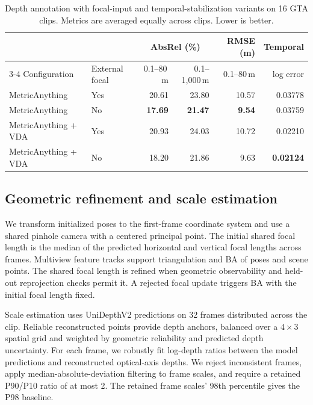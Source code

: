 \begin{table}[t]
    \centering
    \caption{Depth annotation with focal-input and temporal-stabilization variants on 16 GTA clips. Metrics are averaged equally across clips. Lower is better.}
    \label{tab:supp_depth}
    \small
    \setlength{\tabcolsep}{8pt}
    \begin{tabular}{@{}llrrrr@{}}
        \toprule
        & & \multicolumn{2}{c}{AbsRel (\%)} & RMSE (m) & Temporal \\
        \cmidrule(lr){3-4}
        Configuration & External focal & 0.1--80\,m & 0.1--1,000\,m & 0.1--80\,m & log error \\
        \midrule
        MetricAnything & Yes & 20.61 & 23.80 & 10.57 & 0.03778 \\
        MetricAnything & No & \textbf{17.69} & \textbf{21.47} & \textbf{9.54} & 0.03759 \\
        MetricAnything + VDA & Yes & 20.93 & 24.03 & 10.72 & 0.02210 \\
        MetricAnything + VDA & No & 18.20 & 21.86 & 9.63 & \textbf{0.02124} \\
        \bottomrule
    \end{tabular}
\end{table}

\subsection{Geometric refinement and scale estimation}

We transform initialized poses to the first-frame coordinate system and use a shared pinhole camera with a centered principal point.
The initial shared focal length is the median of the predicted horizontal and vertical focal lengths across frames.
Multiview feature tracks support triangulation and BA of poses and scene points.
The shared focal length is refined when geometric observability and held-out reprojection checks permit it.
A rejected focal update triggers BA with the initial focal length fixed.

Scale estimation uses UniDepthV2 predictions on 32 frames distributed across the clip.
Reliable reconstructed points provide depth anchors, balanced over a $4\!\times\!3$ spatial grid and weighted by geometric reliability and predicted depth uncertainty.
For each frame, we robustly fit log-depth ratios between the model predictions and reconstructed optical-axis depths.
We reject inconsistent frames, apply median-absolute-deviation filtering to frame scales, and require a retained P90/P10 ratio of at most 2.
The retained frame scales' 98th percentile gives the P98 baseline.

